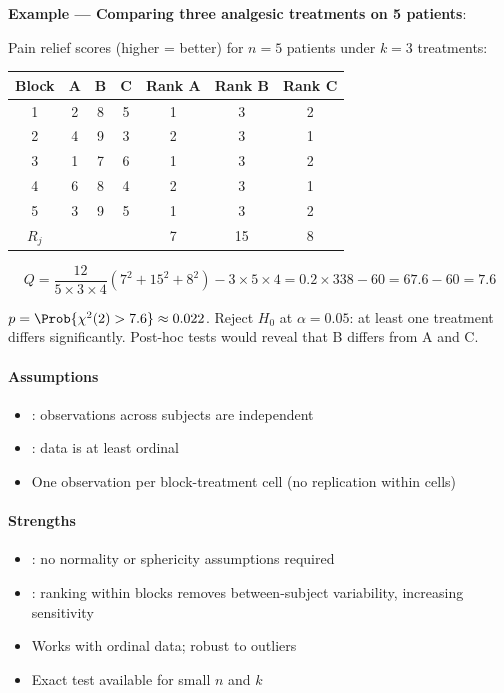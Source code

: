 \textbf{Example — Comparing three analgesic treatments on 5 patients}:

Pain relief scores (higher = better) for $n=5$ patients under $k=3$ treatments:

\begin{center}
\begin{tabular}{|c|ccc|ccc|}
    \hline
    \textbf{Block} & \textbf{A} & \textbf{B} & \textbf{C} &
    \textbf{Rank A} & \textbf{Rank B} & \textbf{Rank C} \\
    \hline
    1 & 2 & 8 & 5 & 1 & 3 & 2 \\
    2 & 4 & 9 & 3 & 2 & 3 & 1 \\
    3 & 1 & 7 & 6 & 1 & 3 & 2 \\
    4 & 6 & 8 & 4 & 2 & 3 & 1 \\
    5 & 3 & 9 & 5 & 1 & 3 & 2 \\
    \hline
    $R_j$ & & & & 7 & 15 & 8 \\
    \hline
\end{tabular}
\end{center}

$$Q = \frac{12}{5 \times 3 \times 4}\left(7^2 + 15^2 + 8^2\right) - 3 \times 5 \times 4
    = 0.2 \times 338 - 60 = 67.6 - 60 = 7.6$$

$p = \Prob{\chi^2(2) > 7.6} \approx 0.022$. Reject $H_0$ at $\alpha = 0.05$: at least
one treatment differs significantly. Post-hoc tests would reveal that B differs from A
and C.

\paragraph{Assumptions}
\begin{itemize}
    \item {}: observations across subjects are independent
    \item {}: data is at least ordinal
    \item One observation per block-treatment cell (no replication within cells)
\end{itemize}

\paragraph{Strengths}
\begin{itemize}
    \item {}: no normality or sphericity assumptions required
    \item {}: ranking within blocks removes between-subject
        variability, increasing sensitivity
    \item Works with ordinal data; robust to outliers
    \item Exact test available for small $n$ and $k$
\end{itemize}

